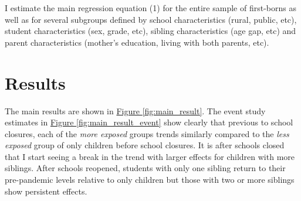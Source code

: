 

I estimate the main regression equation (1) for the entire sample of first-borns as well as for several subgroups defined by school characteristics (rural, public, etc), student characteristics (sex, grade, etc), sibling characteristics (age gap, etc) and parent characteristics (mother's education, living with both parents, etc).


\section{Results}\label{sec:results}

The main results are shown in \hyperref[fig:main_result]{Figure \ref{fig:main_result}}. The event study estimates in \hyperref[fig:main_result_event]{Figure \ref{fig:main_result_event}} show clearly that previous to school closures, each of the \textit{more exposed} groups trends similarly compared to the \textit{less exposed} group of only children before school closures. It is after schools closed that I start seeing a break in the trend with larger effects for children with more siblings. After schools reopened, students with only one sibling return to their pre-pandemic levels relative to only children but those with two or more siblings show persistent effects.

